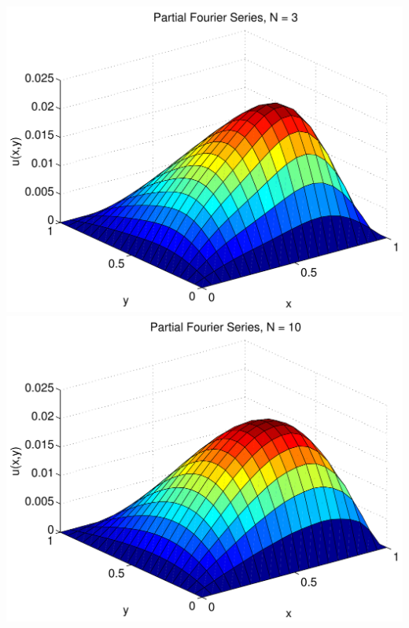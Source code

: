 {\begin{solution}
\begin{enumerate}
\begin{center}
          \includegraphics[scale=0.37]{twoD3}\quad
          \includegraphics[scale=0.37]{twoD10}
      \end{center}

     
\end{enumerate}
\end{solution}}{}

